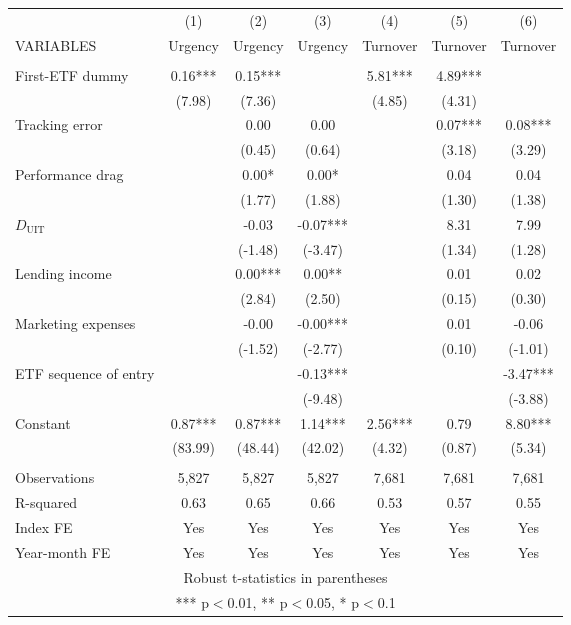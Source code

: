 \documentclass[]{article}
\begin{document}
\begin{tabular}{lcccccc} \hline
 & (1) & (2) & (3) & (4) & (5) & (6) \\
VARIABLES & Urgency & Urgency & Urgency & Turnover & Turnover & Turnover \\ \hline
 &  &  &  &  &  &  \\
First-ETF dummy & 0.16*** & 0.15*** &  & 5.81*** & 4.89*** &  \\
 & (7.98) & (7.36) &  & (4.85) & (4.31) &  \\
Tracking error &  & 0.00 & 0.00 &  & 0.07*** & 0.08*** \\
 &  & (0.45) & (0.64) &  & (3.18) & (3.29) \\
Performance drag &  & 0.00* & 0.00* &  & 0.04 & 0.04 \\
 &  & (1.77) & (1.88) &  & (1.30) & (1.38) \\
$D_\text{UIT}$ &  & -0.03 & -0.07*** &  & 8.31 & 7.99 \\
 &  & (-1.48) & (-3.47) &  & (1.34) & (1.28) \\
Lending income &  & 0.00*** & 0.00** &  & 0.01 & 0.02 \\
 &  & (2.84) & (2.50) &  & (0.15) & (0.30) \\
Marketing expenses &  & -0.00 & -0.00*** &  & 0.01 & -0.06 \\
 &  & (-1.52) & (-2.77) &  & (0.10) & (-1.01) \\
ETF sequence of entry &  &  & -0.13*** &  &  & -3.47*** \\
 &  &  & (-9.48) &  &  & (-3.88) \\
Constant & 0.87*** & 0.87*** & 1.14*** & 2.56*** & 0.79 & 8.80*** \\
 & (83.99) & (48.44) & (42.02) & (4.32) & (0.87) & (5.34) \\
 &  &  &  &  &  &  \\
Observations & 5,827 & 5,827 & 5,827 & 7,681 & 7,681 & 7,681 \\
R-squared & 0.63 & 0.65 & 0.66 & 0.53 & 0.57 & 0.55 \\
Index FE & Yes & Yes & Yes & Yes & Yes & Yes \\
 Year-month FE & Yes & Yes & Yes & Yes & Yes & Yes\\ \hline
\multicolumn{7}{c}{ Robust t-statistics in parentheses} \\
\multicolumn{7}{c}{ *** p$<$0.01, ** p$<$0.05, * p$<$0.1} \\
\end{tabular}
\end{document}
